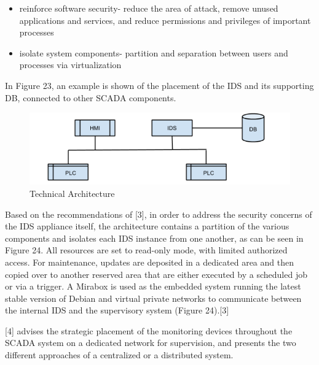 \documentclass[11pt,a4paper]{article}
\begin{document}
\begin{itemize}
\itemsep1pt\parskip0pt
\item
  reinforce software security- reduce the area of attack, remove unused
  applications and services, and reduce permissions and privileges of
  important processes
\item
  isolate system components- partition and separation between users and
  processes via virtualization
\end{itemize}

In Figure 23, an example is shown of the placement of the IDS and its
supporting DB, connected to other SCADA components.

\begin{figure}[h]

{\centering \includegraphics{thesis_files/figure-latex/unnamed-chunk-35-1} 

}

\caption{Technical Architecture}\label{fig:unnamed-chunk-35}
\end{figure}

Based on the recommendations of {[}3{]}, in order to address the
security concerns of the IDS appliance itself, the architecture contains
a partition of the various components and isolates each IDS instance
from one another, as can be seen in Figure 24. All resources are set to
read-only mode, with limited authorized access. For maintenance, updates
are deposited in a dedicated area and then copied over to another
reserved area that are either executed by a scheduled job or via a
trigger. A Mirabox is used as the embedded system running the latest
stable version of Debian and virtual private networks to communicate
between the internal IDS and the supervisory system (Figure 24).{[}3{]}

{[}4{]} advises the strategic placement of the monitoring devices
throughout the SCADA system on a dedicated network for supervision, and
presents the two different approaches of a centralized or a distributed
system.
\end{document}
